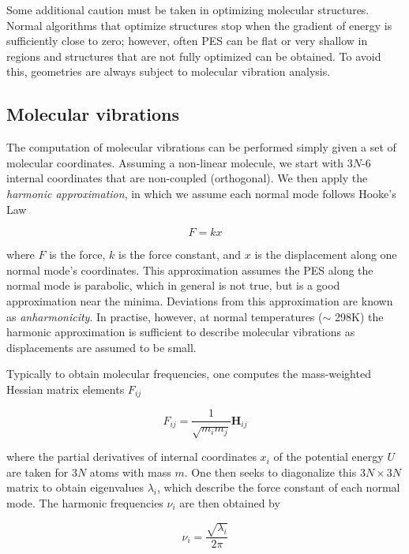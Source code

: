 Some additional caution must be taken in optimizing molecular structures.
Normal algorithms that optimize structures stop when the gradient of energy is
sufficiently close to zero; however, often PES can be flat or very shallow in
regions and structures that are not fully optimized can be obtained. To avoid
this, geometries are always subject to molecular vibration analysis.

\subsection{Molecular vibrations}

The computation of molecular vibrations can be performed simply given a set of
molecular coordinates.\cite{Wilson1980} Assuming a non-linear molecule, we
start with 3$N$-6 internal coordinates that are non-coupled (orthogonal). We
then apply the \emph{harmonic approximation}, in which we assume each normal
mode follows Hooke's Law

\begin{equation}
  F = kx
\end{equation}


\noindent where $F$ is the force, $k$ is the force constant, and $x$ is the
displacement along one normal mode's coordinates. This approximation assumes
the PES along the normal mode is parabolic, which in general is not true, but
is a good approximation near the minima. Deviations from this approximation are
known as \emph{anharmonicity}. In practise, however, at normal temperatures
($\sim$ 298K) the harmonic approximation is sufficient to describe molecular
vibrations as displacements are assumed to be small.

Typically to obtain molecular frequencies, one computes the mass-weighted
Hessian matrix elements $F_{ij}$

\begin{equation}
  F_{ij} = \frac{1}{\sqrt{m_i m_j}} \mathbf{H}_{ij}
\end{equation}

\noindent where the partial derivatives of internal coordinates $x_i$ of the
potential energy $U$ are taken for 3$N$ atoms with mass $m$. One then seeks to
diagonalize this $3N\times3N$ matrix to obtain eigenvalues $\lambda_i$, which
describe the force constant of each normal mode. The harmonic frequencies
$\nu_i$ are then obtained by

\begin{equation}
  \nu_i = \frac{\sqrt{\lambda_i}}{2\pi}
\end{equation}

